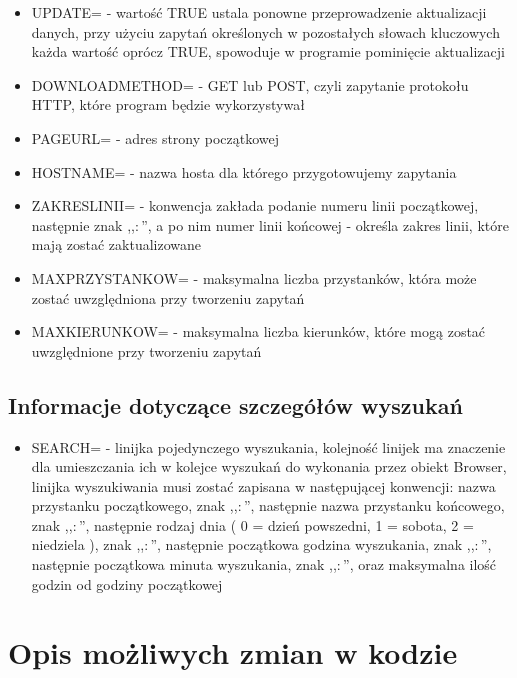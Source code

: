 \documentclass[11pt]{article}
\begin{document}
\begin{itemize}
\item UPDATE= - wartość TRUE ustala ponowne przeprowadzenie aktualizacji  danych, przy użyciu zapytań określonych w pozostałych słowach kluczowych każda wartość oprócz TRUE, spowoduje w programie pominięcie aktualizacji
\item DOWNLOADMETHOD= - GET lub POST, czyli zapytanie protokołu HTTP, które program będzie wykorzystywał
\item PAGEURL= - adres strony początkowej
\item HOSTNAME= - nazwa hosta dla którego przygotowujemy zapytania
\item ZAKRESLINII= - konwencja zakłada podanie numeru linii początkowej, następnie znak ,,$\colon$'', a po nim numer linii końcowej - określa zakres linii, które mają zostać zaktualizowane
\item MAXPRZYSTANKOW= - maksymalna liczba przystanków, która może zostać uwzględniona przy tworzeniu zapytań
\item MAXKIERUNKOW= - maksymalna liczba kierunków, które mogą zostać uwzględnione przy tworzeniu zapytań
\end{itemize}

\subsection{Informacje dotyczące szczegółów wyszukań}

\begin{itemize}
\item SEARCH= - linijka pojedynczego wyszukania, kolejność linijek ma znaczenie dla umieszczania ich w kolejce wyszukań do wykonania przez obiekt Browser, linijka wyszukiwania musi zostać zapisana w następującej konwencji: nazwa przystanku początkowego, znak ,,$\colon$'', następnie nazwa przystanku końcowego, znak ,,$\colon$'', następnie rodzaj dnia ( 0 = dzień powszedni, 1 = sobota, 2 = niedziela ), znak ,,$\colon$'', następnie początkowa godzina wyszukania, znak ,,$\colon$'', następnie początkowa minuta wyszukania, znak ,,$\colon$'', oraz maksymalna ilość godzin od godziny początkowej
\end{itemize}

\section{Opis możliwych zmian w kodzie}
\end{document}
